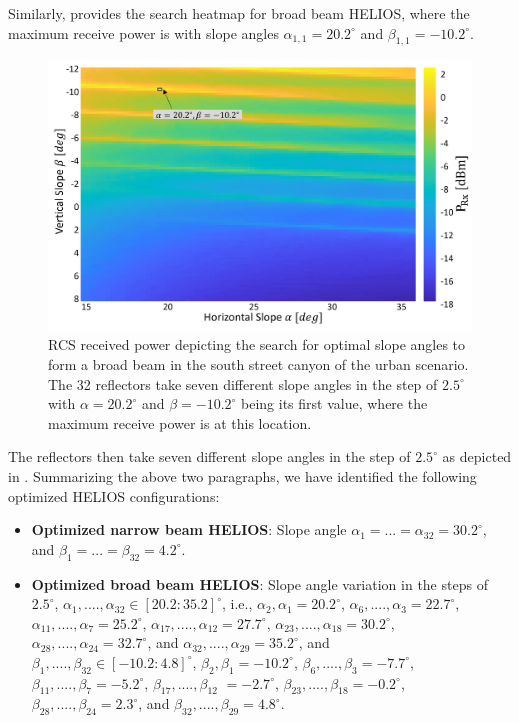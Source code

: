 Similarly,  provides the search heatmap for broad beam HELIOS, where the maximum receive power is with slope angles $\alpha_{1,1}=\num{20.2}^\circ$ and $\beta_{1,1}=\num{-10.2}^\circ$. 
\begin{figure}[H]
	\centering
	\includegraphics[width=0.78\linewidth]{images/Section 4 Images/urbanscenario_broadsearch}
	\caption{RCS received power depicting the search for optimal slope angles to form a broad beam in the south street canyon of the urban scenario. The \num{32} reflectors take seven different slope angles in the step of $\num{2.5}^\circ$ with $\alpha=\num{20.2}^\circ$ and $\beta=\num{-10.2}^\circ$ being its first value, where the maximum receive power is at this location. }
	\label{fig:urbanscenario_broadsearch}
\end{figure}
The reflectors then take seven different slope angles in the step of $\num{2.5}^\circ$ as depicted in . Summarizing the above two paragraphs, we have identified the following optimized HELIOS configurations:
\begin{itemize}
	\item \textbf{Optimized narrow beam HELIOS}: Slope angle $\alpha_{1}=...=\alpha_{32}=\num{30.2}^\circ$, and $\beta_{1}=...=\beta_{32}=\num{4.2}^\circ$.
	\item \textbf{Optimized broad beam HELIOS}: Slope angle variation in the steps of $\num{2.5}^\circ$, $\alpha_{1},....,\alpha_{32} \in [\num{20.2}:\num{35.2}]^\circ$, i.e., $\alpha_{2}, \alpha_{1}= \num{20.2}^\circ$, $\alpha_{6}, ...., \alpha_{3}=  \num{22.7}^\circ$, $\alpha_{11}, ...., \alpha_{7}= \num{25.2}^\circ$, $\alpha_{17}, ...., \alpha_{12}= \num{27.7}^\circ$, $\alpha_{23}, ...., \alpha_{18}= \num{30.2}^\circ$, $\alpha_{28}, ...., \alpha_{24}= \num{32.7}^\circ$, and $\alpha_{32}, ...., \alpha_{29}= \num{35.2}^\circ$,
	and \\
	 $\beta_{1},....,\beta_{32} \in [\num{-10.2}:\num{4.8}]^\circ$, $\beta_{2}, \beta_{1}= \num{-10.2}^\circ$, $\beta_{6}, ...., \beta_{3}=  \num{-7.7}^\circ$, $\beta_{11}, ...., \beta_{7}= \num{-5.2}^\circ$, $\beta_{17}, ...., \beta_{12}$ $=\num{-2.7}^\circ$, $\beta_{23}, ...., \beta_{18}= \num{-0.2}^\circ$, $\beta_{28}, ...., \beta_{24}= \num{2.3}^\circ$, and $\beta_{32}, ...., \beta_{29}= \num{4.8}^\circ$. 
\end{itemize}
